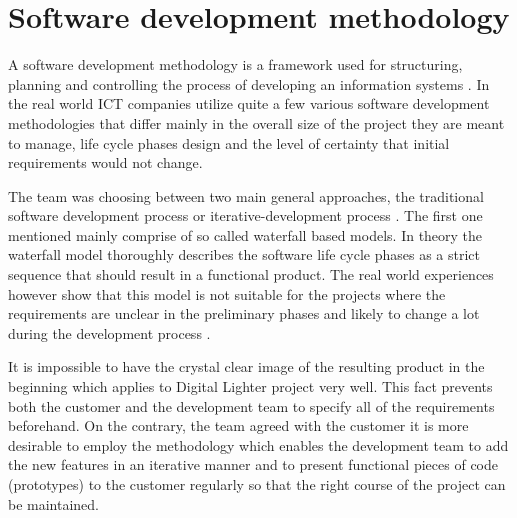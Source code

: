
\section{Software development methodology}
\label{sec:methodology}
A software development methodology is a framework used for structuring, planning and controlling the process of developing an information systems \cite{selectingMethodology}. In the real world ICT companies utilize quite a few various software development methodologies that differ mainly in the overall size of the project they are meant to manage, life cycle phases design and the level of certainty that initial requirements would not change.

The team was choosing between two main general approaches, the traditional software development process or iterative-development process \cite{fairley2009managing}. The first one mentioned mainly comprise of so called waterfall based models. In theory the waterfall model thoroughly describes the software life cycle phases as a strict sequence that should result in a functional product. The real world experiences however show that this model is not suitable for the projects where the requirements are unclear in the preliminary phases and likely to change a lot during the development process \cite{john2011software}.

It is impossible to have the crystal clear image of the resulting product in the beginning\cite{fairley2009managing} which applies to Digital Lighter project very well. This fact prevents both the customer and the development team to specify all of the requirements beforehand. On the contrary, the team agreed with the customer it is more desirable to employ the methodology which enables the development team to add the new features in an iterative manner and to present functional pieces of code (prototypes) to the customer regularly so that the right course of the project can be maintained.

